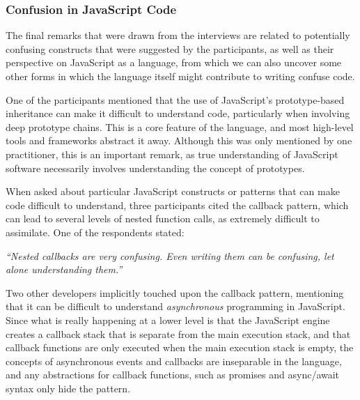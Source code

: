 \subsubsection*{Confusion in JavaScript Code} 

The final remarks that were drawn from the interviews are related to potentially confusing constructs that were suggested by the participants, as well as their perspective on JavaScript as a language, from which we can also uncover some other forms in which the language itself might contribute to writing confuse code.

One of the participants mentioned that the use of JavaScript's prototype-based inheritance can make it difficult to understand code, particularly when involving  deep prototype chains. This is a core feature of the language, and most high-level tools and frameworks abstract it away. Although this was only mentioned by one practitioner, this is an important remark, as true understanding of JavaScript software necessarily involves understanding the concept of prototypes.

When asked about particular JavaScript constructs or patterns that can make code difficult to understand, three participants cited the callback pattern, which can lead to several levels of nested function calls, as extremely difficult to assimilate. One of the respondents stated:

\begin{mq}
\emph{``Nested callbacks are very confusing. Even writing them can be confusing, let alone understanding them.''}
\end{mq}

Two other developers implicitly touched upon the callback pattern, mentioning that it can be difficult to understand \emph{asynchronous} programming in JavaScript. Since what is really happening at a lower level is that the JavaScript engine creates a callback stack that is separate from the main execution stack, and that callback functions are only executed when the main execution stack is empty, the concepts of asynchronous events and callbacks are inseparable in the language, and any abstractions for callback functions, such as promises and async/await syntax only hide the pattern.



